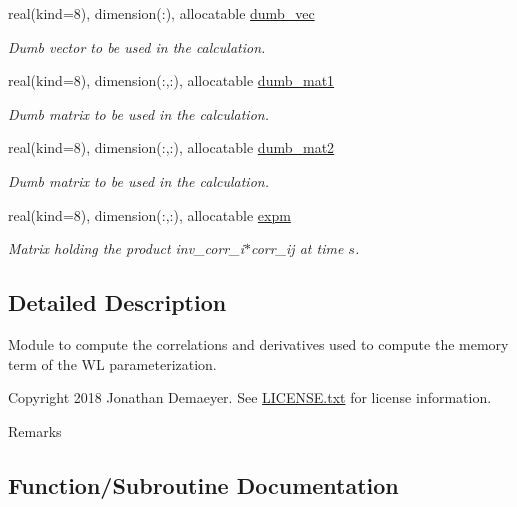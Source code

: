 \begin{DoxyCompactItemize}
real(kind=8), dimension(\+:), allocatable \hyperlink{namespacecorr__tensor_ad86b86fa1ec05686a778ab6b19273a38}{dumb\+\_\+vec}
\begin{DoxyCompactList}\small\item\em Dumb vector to be used in the calculation. \end{DoxyCompactList}\item 
real(kind=8), dimension(\+:,\+:), allocatable \hyperlink{namespacecorr__tensor_aa0f6f11b738412d93dbd832a961d6e78}{dumb\+\_\+mat1}
\begin{DoxyCompactList}\small\item\em Dumb matrix to be used in the calculation. \end{DoxyCompactList}\item 
real(kind=8), dimension(\+:,\+:), allocatable \hyperlink{namespacecorr__tensor_ad46767b09e31f58c53a5a27b12709e30}{dumb\+\_\+mat2}
\begin{DoxyCompactList}\small\item\em Dumb matrix to be used in the calculation. \end{DoxyCompactList}\item 
real(kind=8), dimension(\+:,\+:), allocatable \hyperlink{namespacecorr__tensor_acab3c2a99b90ed8bfc314f41de01e510}{expm}
\begin{DoxyCompactList}\small\item\em Matrix holding the product inv\+\_\+corr\+\_\+i$\ast$corr\+\_\+ij at time $s$. \end{DoxyCompactList}\end{DoxyCompactItemize}


\subsection{Detailed Description}
Module to compute the correlations and derivatives used to compute the memory term of the WL parameterization. 

\begin{DoxyCopyright}{Copyright}
2018 Jonathan Demaeyer. See \hyperlink{LICENSE_8txt}{L\+I\+C\+E\+N\+S\+E.\+txt} for license information. 
\end{DoxyCopyright}
\begin{DoxyRemark}{Remarks}

\end{DoxyRemark}


\subsection{Function/\+Subroutine Documentation}
